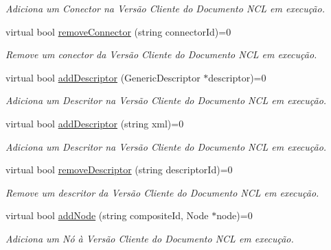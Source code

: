 \begin{DoxyCompactItemize}
\begin{DoxyCompactList}\small\item\em Adiciona um Conector na Versão Cliente do Documento NCL em execução. \item\end{DoxyCompactList}\item 
virtual bool \hyperlink{classbr_1_1ufscar_1_1lince_1_1ginga_1_1wac_1_1editing_1_1IClientEditing_a415ff450552523a495db85c15004c6f9}{removeConnector} (string connectorId)=0
\begin{DoxyCompactList}\small\item\em Remove um conector da Versão Cliente do Documento NCL em execução. \item\end{DoxyCompactList}\item 
virtual bool \hyperlink{classbr_1_1ufscar_1_1lince_1_1ginga_1_1wac_1_1editing_1_1IClientEditing_a8fb8afeaa96087d789b6b0efd9571853}{addDescriptor} (GenericDescriptor $\ast$descriptor)=0
\begin{DoxyCompactList}\small\item\em Adiciona um Descritor na Versão Cliente do Documento NCL em execução. \item\end{DoxyCompactList}\item 
virtual bool \hyperlink{classbr_1_1ufscar_1_1lince_1_1ginga_1_1wac_1_1editing_1_1IClientEditing_af7aa3b95abda814fbf7cadbd277dc2c1}{addDescriptor} (string xml)=0
\begin{DoxyCompactList}\small\item\em Adiciona um Descritor na Versão Cliente do Documento NCL em execução. \item\end{DoxyCompactList}\item 
virtual bool \hyperlink{classbr_1_1ufscar_1_1lince_1_1ginga_1_1wac_1_1editing_1_1IClientEditing_ad3ae20153844de461ded8a643443dc08}{removeDescriptor} (string descriptorId)=0
\begin{DoxyCompactList}\small\item\em Remove um descritor da Versão Cliente do Documento NCL em execução. \item\end{DoxyCompactList}\item 
virtual bool \hyperlink{classbr_1_1ufscar_1_1lince_1_1ginga_1_1wac_1_1editing_1_1IClientEditing_ad8662a9f157872a4cbe7ed0da9baf3fb}{addNode} (string compositeId, Node $\ast$node)=0
\begin{DoxyCompactList}\small\item\em Adiciona um Nó à Versão Cliente do Documento NCL em execução. \item\end{DoxyCompactList}\item 

\end{DoxyCompactItemize}
